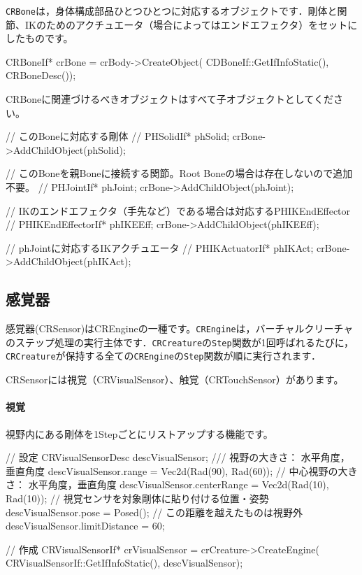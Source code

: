 \texttt{CRBone}\KLUDGE は，身体構成部品ひとつひとつに対応するオブジェクトです．剛体と関節、IK\KLUDGE のためのアクチュエータ（場合によってはエンドエフェクタ）をセットにしたものです。
\begin{sourcecode}
CRBoneIf* crBone = crBody->CreateObject(
  CDBoneIf::GetIfInfoStatic(), CRBoneDesc());
\end{sourcecode}
CRBone\KLUDGE に関連づけるべきオブジェクトはすべて子オブジェクトとしてください。
\begin{sourcecode}
// このBoneに対応する剛体
// PHSolidIf* phSolid; 
crBone->AddChildObject(phSolid);

// このBoneを親Boneに接続する関節。Root Boneの場合は存在しないので追加不要。
// PHJointIf* phJoint;
crBone->AddChildObject(phJoint);

// IKのエンドエフェクタ（手先など）である場合は対応するPHIKEndEffector
// PHIKEndEffectorIf* phIKEEff;
crBone->AddChildObject(phIKEEff);

// phJointに対応するIKアクチュエータ
// PHIKActuatorIf* phIKAct;
crBone->AddChildObject(phIKAct);
\end{sourcecode}


\subsection{\KLUDGE 感覚器}

\KLUDGE 感覚器(CRSensor)\KLUDGE はCREngine\KLUDGE の一種です。\texttt{CREngine}\KLUDGE は，バーチャルクリーチャのステップ処理の実行主体です．\texttt{CRCreature}\KLUDGE の\texttt{Step}\KLUDGE 関数が1\KLUDGE 回呼ばれるたびに，\texttt{CRCreature}\KLUDGE が保持する全ての\texttt{CREngine}\KLUDGE の\texttt{Step}\KLUDGE 関数が順に実行されます．

CRSensor\KLUDGE には視覚（CRVisualSensor\KLUDGE ）、触覚（CRTouchSensor\KLUDGE ）があります。

\paragraph{\KLUDGE 視覚}

\KLUDGE 視野内にある剛体を1Step\KLUDGE ごとにリストアップする機能です。
\begin{sourcecode}
// 設定
CRVisualSensorDesc descVisualSensor;
/// 視野の大きさ： 水平角度，垂直角度
descVisualSensor.range = Vec2d(Rad(90), Rad(60));
// 中心視野の大きさ： 水平角度，垂直角度
descVisualSensor.centerRange = Vec2d(Rad(10), Rad(10));
// 視覚センサを対象剛体に貼り付ける位置・姿勢
descVisualSensor.pose = Posed();
// この距離を越えたものは視野外        
descVisualSensor.limitDistance = 60;	

// 作成
CRVisualSensorIf* crVisualSensor = crCreature->CreateEngine(
  CRVisualSensorIf::GetIfInfoStatic(), descVisualSensor);
\end{sourcecode}

